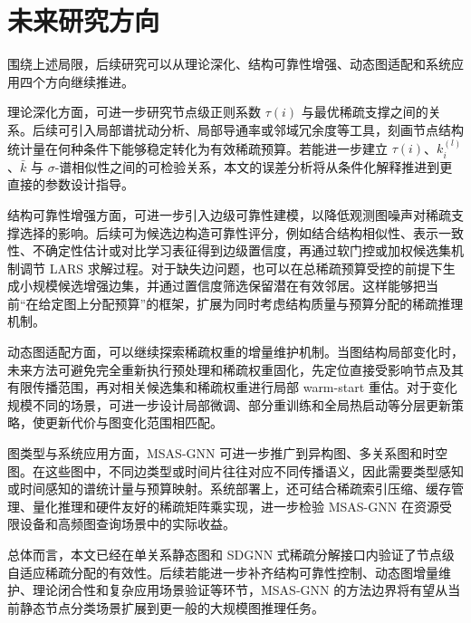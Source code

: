 \section{未来研究方向}\label{sec:ch7-future}

围绕上述局限，后续研究可以从理论深化、结构可靠性增强、动态图适配和系统应用四个方向继续推进。

理论深化方面，可进一步研究节点级正则系数 $\tau(i)$ 与最优稀疏支撑之间的关系。后续可引入局部谱扰动分析、局部导通率或邻域冗余度等工具，刻画节点结构统计量在何种条件下能够稳定转化为有效稀疏预算。若能进一步建立 $\tau(i)$、$k_i^{(l)}$、$\bar{k}$ 与 $\sigma$-谱相似性之间的可检验关系，本文的误差分析将从条件化解释推进到更直接的参数设计指导。

结构可靠性增强方面，可进一步引入边级可靠性建模，以降低观测图噪声对稀疏支撑选择的影响。后续可为候选边构造可靠性评分，例如结合结构相似性、表示一致性、不确定性估计或对比学习表征得到边级置信度，再通过软门控或加权候选集机制调节 LARS 求解过程。对于缺失边问题，也可以在总稀疏预算受控的前提下生成小规模候选增强边集，并通过置信度筛选保留潜在有效邻居。这样能够把当前“在给定图上分配预算”的框架，扩展为同时考虑结构质量与预算分配的稀疏推理机制。

动态图适配方面，可以继续探索稀疏权重的增量维护机制。当图结构局部变化时，未来方法可避免完全重新执行预处理和稀疏权重固化，先定位直接受影响节点及其有限传播范围，再对相关候选集和稀疏权重进行局部 warm-start 重估。对于变化规模不同的场景，可进一步设计局部微调、部分重训练和全局热启动等分层更新策略，使更新代价与图变化范围相匹配。

图类型与系统应用方面，MSAS-GNN 可进一步推广到异构图、多关系图和时空图。在这些图中，不同边类型或时间片往往对应不同传播语义，因此需要类型感知或时间感知的谱统计量与预算映射。系统部署上，还可结合稀疏索引压缩、缓存管理、量化推理和硬件友好的稀疏矩阵乘实现，进一步检验 MSAS-GNN 在资源受限设备和高频图查询场景中的实际收益。

总体而言，本文已经在单关系静态图和 SDGNN 式稀疏分解接口内验证了节点级自适应稀疏分配的有效性。后续若能进一步补齐结构可靠性控制、动态图增量维护、理论闭合性和复杂应用场景验证等环节，MSAS-GNN 的方法边界将有望从当前静态节点分类场景扩展到更一般的大规模图推理任务。